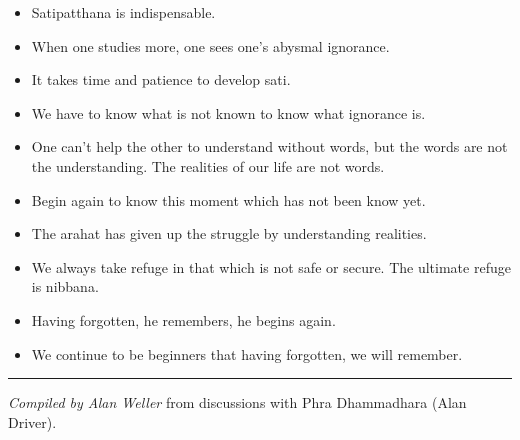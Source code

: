 \documentclass{article}
\begin{document}
\begin{itemize}
\item 
  Satipatthana is indispensable.

\item 
  When one studies more, one sees one's abysmal ignorance.

\item 
  It takes time and patience to develop sati.

\item 
  We have to know what is not known to know what ignorance is.

\item 
  One can't help the other to understand without words, but the words
  are not the understanding. The realities of our life are not
  words.

\item 
  Begin again to know this moment which has not been know yet.

\item 
  The arahat has given up the struggle by understanding realities.

\item 
  We always take refuge in that which is not safe or secure. The
  ultimate refuge is nibbana.

\item 
  Having forgotten, he remembers, he begins again.

\item 
  We continue to be beginners that having forgotten, we will
  remember.

\end{itemize}
\begin{center}\rule{3in}{0.4pt}\end{center}

\emph{Compiled by Alan Weller} from discussions with Phra
Dhammadhara (Alan Driver).
\end{document}

